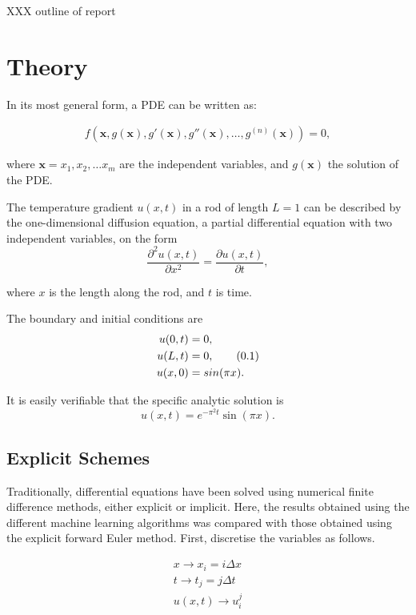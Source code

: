 \documentclass[multicolumn, 9pt]{extarticle}
\newcommand\numberthis{\addtocounter{equation}{1}\tag{\theequation}}
\begin{document}
XXX outline of report

\section{Theory}
In its most general form, a PDE can be written as: 

\begin{align}
\label{eq:f-cost}
	f(\mathbf{x}, g(\mathbf{x}), g'(\mathbf{x}), g''(\mathbf{x}), \dots, g^{(n)}(\mathbf{x})) = 0,
\end{align}

where $\mathbf{x} = x_1, x_2, \dots x_m$ are the independent variables, and $g(\mathbf{x})$ the solution of the PDE. 

The temperature gradient $u(x, t)$ in a rod of length $L=1$ can be described by the one-dimensional diffusion equation, a partial differential equation with two independent variables, on the form
\begin{equation}\label{eq:diff}
	\frac{\partial^2 u(x, t) }{\partial x^2} = \frac{\partial u(x, t)}{\partial t},
\end{equation}

where $x$ is the length along the rod, and $t$ is time. 


The boundary and initial conditions are
\begin{align*}\label{eq:boundary}
	u(0, t) & = 0,             \\
	u(L, t) & = 0, \numberthis \\
	u(x, 0) & = sin(\pi x).
\end{align*}

It is easily verifiable that the specific analytic solution is
\begin{equation}\label{eq:anal}
	u(x, t) = e^{-\pi^2t}\sin(\pi x).
\end{equation}

\subsection{Explicit Schemes}
Traditionally, differential equations have been solved using numerical finite difference methods, either explicit or implicit. Here, the results obtained using the different machine learning algorithms was compared with those obtained using the explicit forward Euler method. First, discretise the variables as follows.

\begin{align*}
	x \rightarrow x_{i} = i\Delta x  \\
	t \rightarrow t_{j} = j \Delta t \\
	u(x, t)  \rightarrow u_{i}^{j}
\end{align*}
\end{document}
